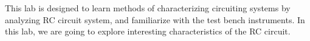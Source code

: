 This lab is designed to learn methods of characterizing circuiting systems by analyzing RC circuit system, and familiarize with the test bench instruments. In this lab, we are going to explore interesting characteristics of the RC circuit. 